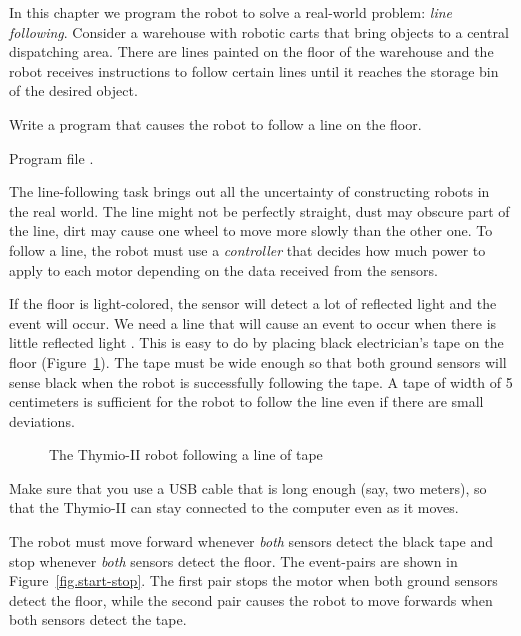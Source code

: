 \label{ch.line}

In this chapter we program the robot to solve a real-world problem:
\emph{line following}. Consider a warehouse with robotic carts that
bring objects to a central dispatching area. There are lines painted on
the floor of the warehouse and the robot receives instructions to follow
certain lines until it reaches the storage bin of the desired object.

Write a program that causes the robot to follow a line on the floor.

{\raggedleft \hfill Program file .}

The line-following task brings out all the uncertainty of constructing
robots in the real world. The line might not be perfectly straight, dust
may obscure part of the line, dirt may cause one wheel to move more
slowly than the other one. To follow a line, the robot must use a
\emph{controller} that decides how much power to apply to each motor
depending on the data received from the sensors.


If the floor is light-colored, the sensor will detect a lot of reflected
light and the event  will occur. We need a line
that will cause an event to occur when there is little reflected light
. This is easy to do by placing black
electrician's tape on the floor (Figure~\ref{fig.tape}). The tape must
be wide enough so that both ground sensors will sense black when the
robot is successfully following the tape. A tape of width of 5
centimeters is sufficient for the robot to follow the line even if there
are small deviations.

\begin{figure}
\begin{center}
\caption{The Thymio-II robot following a line of tape}\label{fig.tape}
\end{center}
\end{figure}

Make sure that you use a USB cable that is long enough (say, two
meters), so that the Thymio-II can stay connected to the computer even
as it moves.


The robot must move forward whenever \emph{both} sensors detect the
black tape and stop whenever \emph{both} sensors detect the floor. The
event-pairs are shown in Figure~\ref{fig.start-stop}. The first pair
stops the motor when both ground sensors detect the floor, while the
second pair causes the robot to move forwards when both sensors detect
the tape.

